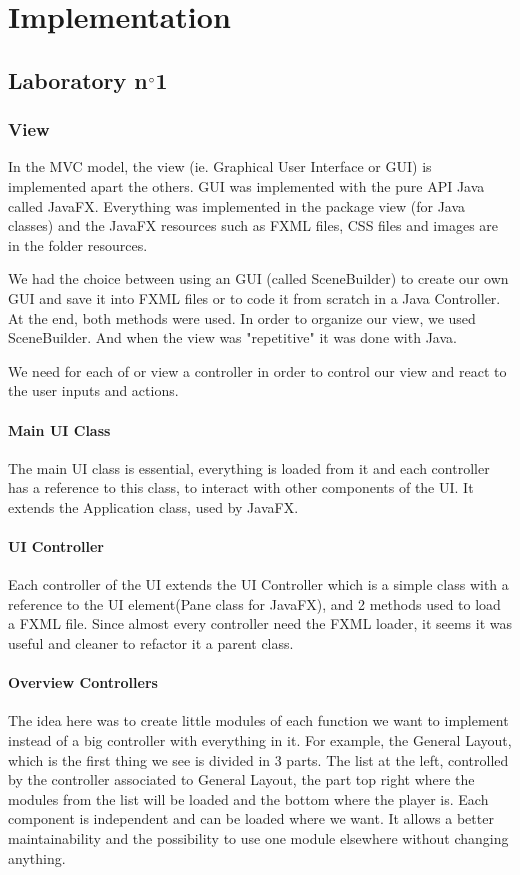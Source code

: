 \documentclass{report}
\begin{document}
\chapter{Implementation}

\section{Laboratory n$\degree$1}

\subsection{View}
In the MVC model, the view (ie. Graphical User Interface or GUI) is implemented apart the others. GUI was implemented with the pure API Java called JavaFX. 
Everything was implemented in the package view (for Java classes) and the JavaFX resources such as FXML files, CSS files and images are in the folder resources. 

We had the choice between using an GUI (called SceneBuilder) to create our own GUI and save it into FXML files or to code it from scratch in a Java Controller. At the end, both methods were used. In order to organize our view, we used SceneBuilder. And when the view was "repetitive" it was done with Java.

We need for each of or view a controller in order to control our view and react to the user inputs and actions.

\subsubsection{Main UI Class}
The main UI class is essential, everything is loaded from it and each controller has a reference to this class, to interact with other components of the UI. It extends the Application class, used by JavaFX.

\subsubsection{UI Controller}
Each controller of the UI extends the UI Controller which is a simple class with a reference to the UI element(Pane class for JavaFX), and 2 methods used to load a FXML file. Since almost every controller need the FXML loader, it seems it was useful and cleaner to refactor it a parent class.

\subsubsection{Overview Controllers}
The idea here was to create little modules of each function we want to implement instead of a big controller with everything in it. For example, the General Layout, which is the first thing we see is divided in 3 parts. The list at the left, controlled by the controller associated to General Layout, the part top right where the modules from the list will be loaded and the bottom where the player is. Each component is independent and can be loaded where we want. It allows a better maintainability and the possibility to use one module elsewhere without changing anything.
\end{document}
